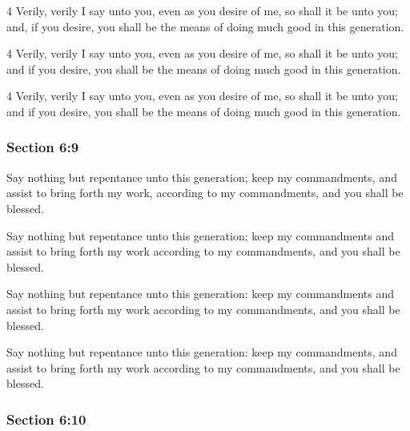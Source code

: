 		\begin{framed}
		\scriptsize
			\begin{compactdesc}
				\item[JSP] 4 Verily, verily I say unto you, even as you desire of me, so shall it be unto you; and, if you desire, you shall be the means of doing much good in this generation.
				\item[DC 1835] 4 Verily, verily I say unto you, even as you desire of me, so shall it be unto you; and if you desire, you shall be the means of doing much good in this generation.
				\item[DC 1844] 4 Verily, verily I say unto you, even as you desire of me, so shall it be unto you; and if you desire, you shall be the means of doing much good in this generation.
			\end{compactdesc}
		\end{framed}

	\subsubsection{Section 6:9} %
		\label{DC6-9}

		Say nothing but repentance unto this generation; keep my commandments, and assist to bring forth my work, according to my commandments, and you shall be blessed.

		\begin{framed}
		\scriptsize
			\begin{compactdesc}
				\item[JSP] Say nothing but repentance unto this generation; keep my commandments and assist to bring forth my work according to my commandments, and you shall be blessed.
				\item[DC 1835] Say nothing but repentance unto this generation: keep my commandments and assist to bring forth my work according to my commandments, and you shall be blessed.
				\item[DC 1844] Say nothing but repentance unto this generation: keep my commandments, and assist to bring forth my work according to my commandments, and you shall be blessed.
			\end{compactdesc}
		\end{framed}

	\subsubsection{Section 6:10} %
		\label{DC6-10}

